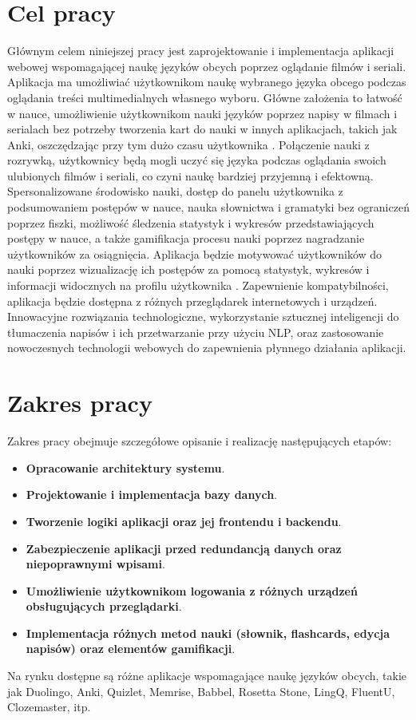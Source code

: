\section{Cel pracy}
Głównym celem niniejszej pracy jest zaprojektowanie i implementacja aplikacji webowej wspomagającej naukę języków obcych poprzez oglądanie filmów i seriali. Aplikacja ma umożliwiać użytkownikom naukę wybranego języka obcego podczas oglądania treści multimedialnych własnego wyboru. Główne założenia to łatwość w nauce, umożliwienie użytkownikom nauki języków poprzez napisy w filmach i serialach bez potrzeby tworzenia kart do nauki w innych aplikacjach, takich jak Anki, oszczędzając przy tym dużo czasu użytkownika \cite{tekalp2023effects} \cite{kovacs2014smart}. Połączenie nauki z rozrywką, użytkownicy będą mogli uczyć się języka podczas oglądania swoich ulubionych filmów i seriali, co czyni naukę bardziej przyjemną i efektowną. Spersonalizowane środowisko nauki, dostęp do panelu użytkownika z podsumowaniem postępów w nauce, nauka słownictwa i gramatyki bez ograniczeń poprzez fiszki, możliwość śledzenia statystyk i wykresów przedstawiających postępy w nauce, a także gamifikacja procesu nauki poprzez nagradzanie użytkowników za osiągnięcia. Aplikacja będzie motywować użytkowników do nauki poprzez wizualizację ich postępów za pomocą statystyk, wykresów i informacji widocznych na profilu użytkownika \cite{talavan2006using}. Zapewnienie kompatybilności, aplikacja będzie dostępna z różnych przeglądarek internetowych i urządzeń. Innowacyjne rozwiązania technologiczne, wykorzystanie sztucznej inteligencji do tłumaczenia napisów i ich przetwarzanie przy użyciu NLP, oraz zastosowanie nowoczesnych technologii webowych do zapewnienia płynnego działania aplikacji.

\section{Zakres pracy}
Zakres pracy obejmuje szczegółowe opisanie i realizację następujących etapów:

\begin{itemize}
      \item \textbf{Opracowanie architektury systemu}.
      \item \textbf{Projektowanie i implementacja bazy danych}.
      \item \textbf{Tworzenie logiki aplikacji oraz jej frontendu i backendu}.
      \item \textbf{Zabezpieczenie aplikacji przed redundancją danych oraz niepoprawnymi wpisami}.
      \item \textbf{Umożliwienie użytkownikom logowania z różnych urządzeń obsługujących przeglądarki}.
      \item \textbf{Implementacja różnych metod nauki (słownik, flashcards, edycja napisów) oraz elementów gamifikacji}.
\end{itemize}
Na rynku dostępne są różne aplikacje wspomagające naukę języków obcych, takie jak Duolingo, Anki, Quizlet, Memrise, Babbel, Rosetta Stone, LingQ, FluentU, Clozemaster, itp.
